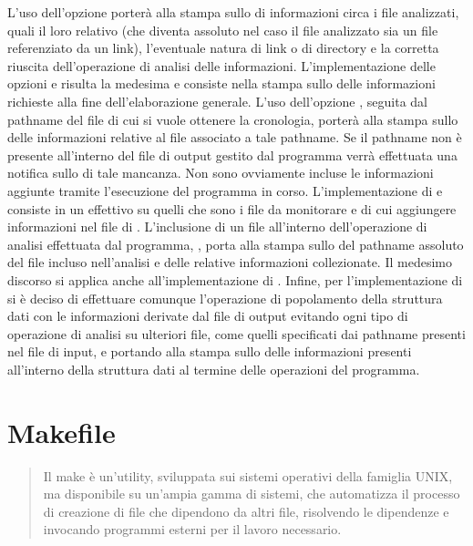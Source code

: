 \documentclass[letterpaper,10pt,italian,openany,oneside]{sphinxmanual}
\begin{document}
L’uso dell’opzione  porterà alla stampa sullo  di informazioni circa i file analizzati, quali il loro  relativo (che diventa assoluto nel caso il file
analizzato sia un file referenziato da un link), l’eventuale natura di link o di directory e la corretta riuscita dell’operazione di analisi delle informazioni.
L’implementazione delle opzioni  e  risulta la medesima e consiste nella stampa sullo  delle informazioni richieste alla fine dell’elaborazione generale.
L’uso dell’opzione , seguita dal pathname del file di cui si vuole ottenere la cronologia, porterà alla stampa sullo  delle informazioni relative al file associato a tale pathname.
Se il pathname non è presente all’interno del file di output gestito dal programma verrà effettuata una notifica sullo  di tale mancanza. Non sono ovviamente incluse le informazioni
aggiunte tramite l’esecuzione del programma in corso.
L’implementazione di  e  consiste in un  effettivo su quelli che sono i file da monitorare e di cui aggiungere informazioni nel file di .
L’inclusione di un file all’interno dell’operazione di analisi effettuata dal programma, , porta alla stampa sullo  del pathname assoluto del file incluso nell’analisi
e delle relative informazioni collezionate.
Il medesimo discorso si applica anche all’implementazione di .
Infine, per l’implementazione di  si è deciso di effettuare comunque l’operazione di popolamento della struttura dati con le informazioni derivate dal file di output evitando ogni tipo
di operazione di analisi su ulteriori file, come quelli specificati dai pathname presenti nel file di input, e portando alla stampa sullo  delle informazioni presenti all’interno della struttura
dati al termine delle operazioni del programma.


\section{Makefile}
\label{\detokenize{project:makefile}}\begin{quote}

Il make è un’utility, sviluppata sui sistemi operativi della famiglia UNIX, ma disponibile su un’ampia gamma di sistemi, che automatizza
il processo di creazione di file che dipendono da altri file, risolvendo le dipendenze e invocando programmi esterni per il lavoro necessario.
\end{quote}
\end{document}
